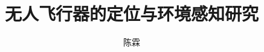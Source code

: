\documentclass[bachelor]{ustcthesis}
\title{无人飞行器的定位与环境感知研究}
\author{陈霖}
\begin{document}
%

\maketitle
\makestatement

\frontmatter

\tableofcontents


\mainmatter









\appendix


\backmatter

\end{document}
